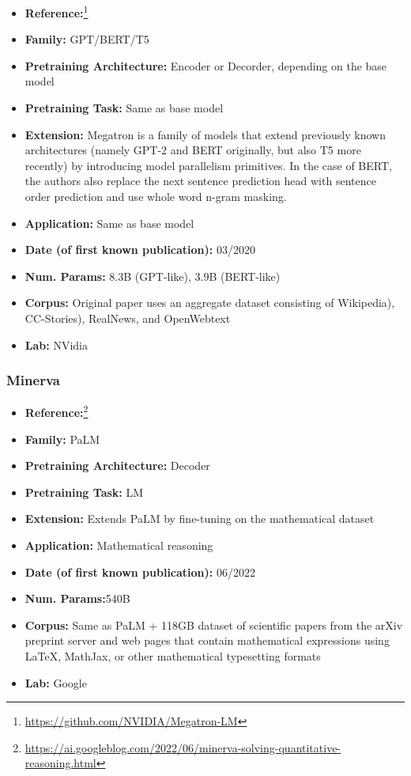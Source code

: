 \documentclass{article}
\begin{document}
            \begin{itemize}
                \item \textbf{Reference:}\footnote{\url{https://github.com/NVIDIA/Megatron-LM}}\cite{shoeybi2019megatron}
                \item \textbf{Family:} GPT/BERT/T5 
                \item \textbf{Pretraining Architecture:} Encoder or Decorder, depending on the base model
                \item \textbf{Pretraining Task:} Same as base model
                \item \textbf{Extension:} Megatron is a family of models that extend previously known architectures (namely GPT-2 and BERT originally, but also T5 more recently) by introducing model parallelism primitives. In the case of BERT, the authors also replace the next sentence prediction head with sentence order prediction and use whole word n-gram masking.  
                \item \textbf{Application:} Same as base model
                \item \textbf{Date (of first known publication):} 03/2020
                \item \textbf{Num. Params:} 8.3B (GPT-like), 3.9B (BERT-like)
                \item \textbf{Corpus:} Original paper uses an aggregate dataset consisting of Wikipedia), CC-Stories), RealNews, and OpenWebtext
                \item \textbf{Lab:} NVidia
            \end{itemize}

\subsubsection{Minerva}

            \begin{itemize}
                \item \textbf{Reference:}\footnote{\url{https://ai.googleblog.com/2022/06/minerva-solving-quantitative-reasoning.html}}\cite{lewkowycz2022solving}
                \item \textbf{Family:} PaLM 
                \item \textbf{Pretraining Architecture:} Decoder
                \item \textbf{Pretraining Task:} LM
                \item \textbf{Extension:} Extends PaLM by fine-tuning on the mathematical dataset  
                \item \textbf{Application:} Mathematical reasoning
                \item \textbf{Date (of first known publication):} 06/2022
                \item \textbf{Num. Params:}540B
                \item \textbf{Corpus:} Same as PaLM + 118GB dataset of scientific papers from the arXiv preprint server and web pages that contain mathematical expressions using LaTeX, MathJax, or other mathematical typesetting formats
                \item \textbf{Lab:} Google
            \end{itemize}
\end{document}
